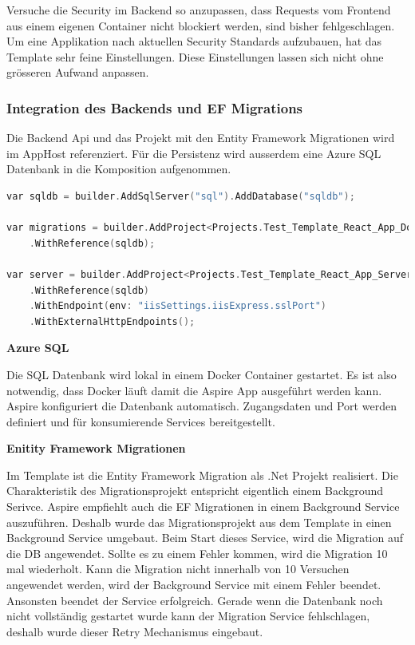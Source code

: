            Versuche die Security im Backend so anzupassen, dass Requests vom Frontend aus einem eigenen Container nicht blockiert werden, sind bisher fehlgeschlagen. Um eine Applikation nach aktuellen Security Standards aufzubauen, hat das Template sehr feine Einstellungen. Diese Einstellungen lassen sich nicht ohne grösseren Aufwand anpassen.            

            \subsubsection{Integration des Backends und EF Migrations}

            Die Backend Api und das Projekt mit den Entity Framework Migrationen wird im AppHost referenziert. Für die Persistenz wird ausserdem eine Azure SQL Datenbank in die Komposition aufgenommen.

            \begin{lstlisting}[language=C, caption=Integration der Entity Framework Migration]
var sqldb = builder.AddSqlServer("sql").AddDatabase("sqldb");

var migrations = builder.AddProject<Projects.Test_Template_React_App_Domain_Migrations>("migrations")
    .WithReference(sqldb);

var server = builder.AddProject<Projects.Test_Template_React_App_Server>("server")
    .WithReference(sqldb)
    .WithEndpoint(env: "iisSettings.iisExpress.sslPort")
    .WithExternalHttpEndpoints();
            \end{lstlisting}

            \textbf{Azure SQL}
            
            Die SQL Datenbank wird lokal in einem Docker Container gestartet. Es ist also notwendig, dass Docker läuft damit die Aspire App ausgeführt werden kann. Aspire konfiguriert die Datenbank automatisch. Zugangsdaten und Port werden definiert und für konsumierende Services bereitgestellt.

            \textbf{Enitity Framework Migrationen}

            Im Template ist die Entity Framework Migration als .Net Projekt realisiert. Die Charakteristik des Migrationsprojekt entspricht eigentlich einem Background Serivce. Aspire empfiehlt auch die EF Migrationen in einem Background Service auszuführen. Deshalb wurde das Migrationsprojekt aus dem Template in einen Background Service umgebaut. Beim Start dieses Service, wird die Migration auf die DB angewendet. Sollte es zu einem Fehler kommen, wird die Migration 10 mal wiederholt. Kann die Migration nicht innerhalb von 10 Versuchen angewendet werden, wird der Background Service mit einem Fehler beendet. Ansonsten beendet der Service erfolgreich. Gerade wenn die Datenbank noch nicht vollständig gestartet wurde kann der Migration Service fehlschlagen, deshalb wurde dieser Retry Mechanismus eingebaut.


